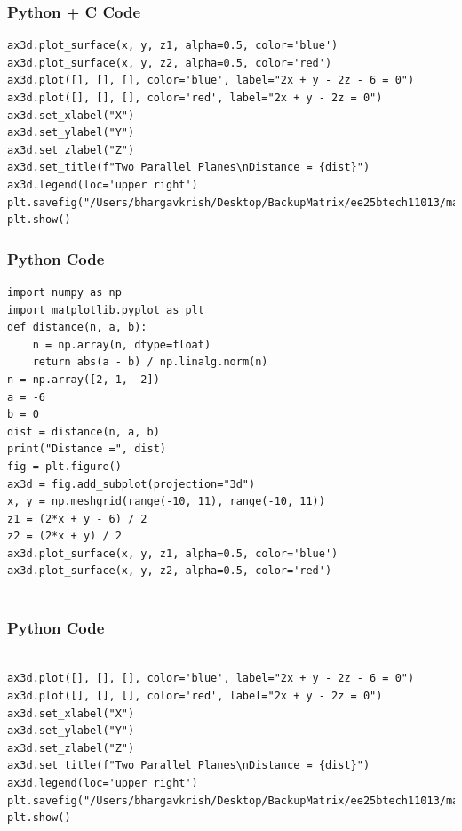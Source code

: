 \documentclass{beamer}
\begin{document}
\begin{frame}[fragile]
    \frametitle{Python + C Code }

    \begin{lstlisting}
ax3d.plot_surface(x, y, z1, alpha=0.5, color='blue')
ax3d.plot_surface(x, y, z2, alpha=0.5, color='red')
ax3d.plot([], [], [], color='blue', label="2x + y - 2z - 6 = 0")
ax3d.plot([], [], [], color='red', label="2x + y - 2z = 0")
ax3d.set_xlabel("X")
ax3d.set_ylabel("Y")
ax3d.set_zlabel("Z")
ax3d.set_title(f"Two Parallel Planes\nDistance = {dist}")
ax3d.legend(loc='upper right')
plt.savefig("/Users/bhargavkrish/Desktop/BackupMatrix/ee25btech11013/matgeo/4.6.1/figs/Figure_1.png")
plt.show()

    \end{lstlisting}
\end{frame}

\begin{frame}[fragile]
    \frametitle{Python Code }

    \begin{lstlisting}
import numpy as np
import matplotlib.pyplot as plt
def distance(n, a, b):
    n = np.array(n, dtype=float)
    return abs(a - b) / np.linalg.norm(n)
n = np.array([2, 1, -2])
a = -6
b = 0
dist = distance(n, a, b)
print("Distance =", dist)
fig = plt.figure()
ax3d = fig.add_subplot(projection="3d")
x, y = np.meshgrid(range(-10, 11), range(-10, 11))
z1 = (2*x + y - 6) / 2
z2 = (2*x + y) / 2
ax3d.plot_surface(x, y, z1, alpha=0.5, color='blue')
ax3d.plot_surface(x, y, z2, alpha=0.5, color='red')


    \end{lstlisting}
\end{frame}

\begin{frame}[fragile]
    \frametitle{Python Code }

    \begin{lstlisting}

ax3d.plot([], [], [], color='blue', label="2x + y - 2z - 6 = 0")
ax3d.plot([], [], [], color='red', label="2x + y - 2z = 0")
ax3d.set_xlabel("X")
ax3d.set_ylabel("Y")
ax3d.set_zlabel("Z")
ax3d.set_title(f"Two Parallel Planes\nDistance = {dist}")
ax3d.legend(loc='upper right')
plt.savefig("/Users/bhargavkrish/Desktop/BackupMatrix/ee25btech11013/matgeo/4.6.1/figs/Figure_1.png")
plt.show()



    \end{lstlisting}
\end{frame}
\end{document}
